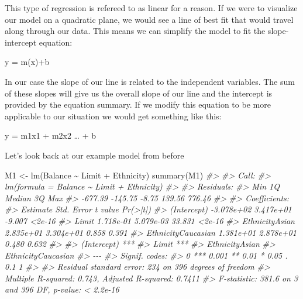 \documentclass[
]{book}
\newenvironment{Shaded}{\begin{snugshade}}{\end{snugshade}}
\newcommand{\CommentTok}[1]{\textcolor[rgb]{0.56,0.35,0.01}{\textit{#1}}}
\newcommand{\FunctionTok}[1]{\textcolor[rgb]{0.00,0.00,0.00}{#1}}
\newcommand{\NormalTok}[1]{#1}
\newcommand{\OtherTok}[1]{\textcolor[rgb]{0.56,0.35,0.01}{#1}}
\newcommand{\SpecialCharTok}[1]{\textcolor[rgb]{0.00,0.00,0.00}{#1}}
\begin{document}
This type of regression is refereed to as linear for a reason. If we were to visualize our model on a quadratic plane, we would see a line of best fit that would travel along through our data. This means we can simplify the model to fit the slope-intercept equation:

y = m(x)+b

In our case the slope of our line is related to the independent variables. The sum of these slopes will give us the overall slope of our line and the intercept is provided by the equation summary. If we modify this equation to be more applicable to our situation we would get something like this:

y = m1x1 + m2x2 \ldots{} + b

Let's look back at our example model from before

\begin{Shaded}
\begin{Highlighting}[]
\NormalTok{M1 }\OtherTok{\textless{}{-}} \FunctionTok{lm}\NormalTok{(Balance }\SpecialCharTok{\textasciitilde{}}\NormalTok{ Limit }\SpecialCharTok{+}\NormalTok{ Ethnicity)}
\FunctionTok{summary}\NormalTok{(M1)}
\CommentTok{\#\textgreater{} }
\CommentTok{\#\textgreater{} Call:}
\CommentTok{\#\textgreater{} lm(formula = Balance \textasciitilde{} Limit + Ethnicity)}
\CommentTok{\#\textgreater{} }
\CommentTok{\#\textgreater{} Residuals:}
\CommentTok{\#\textgreater{}     Min      1Q  Median      3Q     Max }
\CommentTok{\#\textgreater{} {-}677.39 {-}145.75   {-}8.75  139.56  776.46 }
\CommentTok{\#\textgreater{} }
\CommentTok{\#\textgreater{} Coefficients:}
\CommentTok{\#\textgreater{}                      Estimate Std. Error t value Pr(\textgreater{}|t|)}
\CommentTok{\#\textgreater{} (Intercept)        {-}3.078e+02  3.417e+01  {-}9.007   \textless{}2e{-}16}
\CommentTok{\#\textgreater{} Limit               1.718e{-}01  5.079e{-}03  33.831   \textless{}2e{-}16}
\CommentTok{\#\textgreater{} EthnicityAsian      2.835e+01  3.304e+01   0.858    0.391}
\CommentTok{\#\textgreater{} EthnicityCaucasian  1.381e+01  2.878e+01   0.480    0.632}
\CommentTok{\#\textgreater{}                       }
\CommentTok{\#\textgreater{} (Intercept)        ***}
\CommentTok{\#\textgreater{} Limit              ***}
\CommentTok{\#\textgreater{} EthnicityAsian        }
\CommentTok{\#\textgreater{} EthnicityCaucasian    }
\CommentTok{\#\textgreater{} {-}{-}{-}}
\CommentTok{\#\textgreater{} Signif. codes:  }
\CommentTok{\#\textgreater{} 0 \textquotesingle{}***\textquotesingle{} 0.001 \textquotesingle{}**\textquotesingle{} 0.01 \textquotesingle{}*\textquotesingle{} 0.05 \textquotesingle{}.\textquotesingle{} 0.1 \textquotesingle{} \textquotesingle{} 1}
\CommentTok{\#\textgreater{} }
\CommentTok{\#\textgreater{} Residual standard error: 234 on 396 degrees of freedom}
\CommentTok{\#\textgreater{} Multiple R{-}squared:  0.743,  Adjusted R{-}squared:  0.7411 }
\CommentTok{\#\textgreater{} F{-}statistic: 381.6 on 3 and 396 DF,  p{-}value: \textless{} 2.2e{-}16}
\end{Highlighting}
\end{Shaded}
\end{document}
